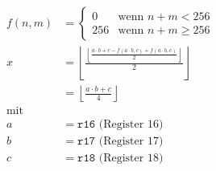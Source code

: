 \begin{align*}
f(n,m) &= \begin{cases}
               0               & \mbox{wenn } n+m < 256\\
               256             & \mbox{wenn } n+m \geq 256
           \end{cases}\\
     x &= \left \lfloor\frac{\left\lfloor\frac{a \cdot b+c-f(a\cdot b,c)+f(a\cdot b,c)}{2} \right\rfloor}{2} \right\rfloor\\
       &= \left\lfloor\frac{a \cdot b+c}{4} \right\rfloor\\
\text{mit}\\
     a &= \mathtt{r16}\text{ (Register 16)}\\
     b &= \mathtt{r17}\text{ (Register 17)}\\
     c &= \mathtt{r18}\text{ (Register 18)}\\
\end{align*}
